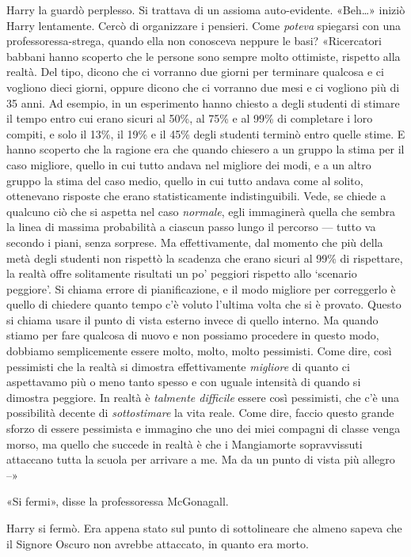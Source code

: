 Harry la guardò perplesso. Si trattava di un assioma auto-evidente. «Beh…» iniziò Harry lentamente. Cercò di organizzare i pensieri. Come \textit{poteva} spiegarsi con una professoressa-strega, quando ella non conosceva neppure le basi? «Ricercatori babbani hanno scoperto che le persone sono sempre molto ottimiste, rispetto alla realtà. Del tipo, dicono che ci vorranno due giorni per terminare qualcosa e ci vogliono dieci giorni, oppure dicono che ci vorranno due mesi e ci vogliono più di 35 anni. Ad esempio, in un esperimento hanno chiesto a degli studenti di stimare il tempo entro cui erano sicuri al 50\%, al 75\% e al 99\% di completare i loro compiti, e solo il 13\%, il 19\% e il 45\% degli studenti terminò entro quelle stime. E hanno scoperto che la ragione era che quando chiesero a un gruppo la stima per il caso migliore, quello in cui tutto andava nel migliore dei modi, e a un altro gruppo la stima del caso medio, quello in cui tutto andava come al solito, ottenevano risposte che erano statisticamente indistinguibili. Vede, se chiede a qualcuno ciò che si aspetta nel caso \textit{normale}, egli immaginerà quella che sembra la linea di massima probabilità a ciascun passo lungo il percorso — tutto va secondo i piani, senza sorprese. Ma effettivamente, dal momento che più della metà degli studenti non rispettò la scadenza che erano sicuri al 99\% di rispettare, la realtà offre solitamente risultati un po’ peggiori rispetto allo ‘scenario peggiore’. Si chiama errore di pianificazione, e il modo migliore per correggerlo è quello di chiedere quanto tempo c’è voluto l’ultima volta che si è provato. Questo si chiama usare il punto di vista esterno invece di quello interno. Ma quando stiamo per fare qualcosa di nuovo e non possiamo procedere in questo modo, dobbiamo semplicemente essere molto, molto, molto pessimisti. Come dire, così pessimisti che la realtà si dimostra effettivamente \textit{migliore} di quanto ci aspettavamo più o meno tanto spesso e con uguale intensità di quando si dimostra peggiore. In realtà è \textit{talmente difficile} essere così pessimisti, che c’è una possibilità decente di \textit{sottostimare} la vita reale. Come dire, faccio questo grande sforzo di essere pessimista e immagino che uno dei miei compagni di classe venga morso, ma quello che succede in realtà è che i Mangiamorte sopravvissuti attaccano tutta la scuola per arrivare a me. Ma da un punto di vista più allegro –»

«Si fermi», disse la professoressa McGonagall.

Harry si fermò. Era appena stato sul punto di sottolineare che almeno sapeva che il Signore Oscuro non avrebbe attaccato, in quanto era morto.

